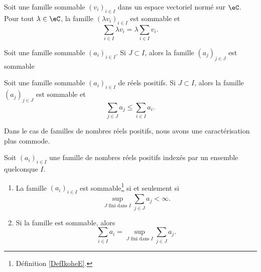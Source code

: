 \begin{lemma}   \label{LEMooHFNXooFHfwzf}
	Soit une famille sommable \( (v_i)_{i\in I}\) dans un espace vectoriel normé sur \( \eC\). Pour tout \( \lambda\in \eC\), la famille \( (\lambda v_i)_{i\in I}\) est sommable et
	\begin{equation}
		\sum_{i\in I}\lambda v_i=\lambda\sum_{i\in I}v_i.
	\end{equation}
\end{lemma}

\begin{lemma}   \label{LEMooSBYEooNXzqJU}
	Soit une famille sommable \( (a_i)_{i\in I}\). Si \( J\subset I\), alors la famille \( (a_j)_{j\in J}\) est sommable
\end{lemma}

\begin{lemma}   \label{LEMooAYFUooLMBBDn}
	Soit une famille sommable \( (a_i)_{i\in I}\) de réels positifs. Si \( J\subset I\), alors la famille \( (a_j)_{j\in J}\) est sommable et
	\begin{equation}
		\sum_{j\in J}a_j\leq \sum_{i\in I} a_i.
	\end{equation}
\end{lemma}

Dans le cas de familles de nombres réels positifs, nous avons une caractérisation plus commode.
\begin{proposition}  \label{PROPooOYNRooQFpBly}
	Soit \( (a_i)_{i\in I}\) une famille de nombres réels positifs indexés par un ensemble quelconque \( I\).
	\begin{enumerate}
		\item       \label{ITEMooAYKKooVxXp}
		      La famille \( (a_i)_{i\in I}\) est sommable\footnote{Définition \ref{DefIkoheE}.} si et seulement si
		      \begin{equation}
			      \sup_{ J\text{ fini dans } I}\sum_{j\in J}a_j<\infty.
		      \end{equation}
		\item       \label{ITEMooSDCYooNsbHez}
		      Si la famille est sommable, alors
		      \begin{equation}
			      \sum_{i\in I}a_i=\sup_{ J\text{ fini dans } I}\sum_{j\in J}a_j.
		      \end{equation}
	\end{enumerate}
\end{proposition}

